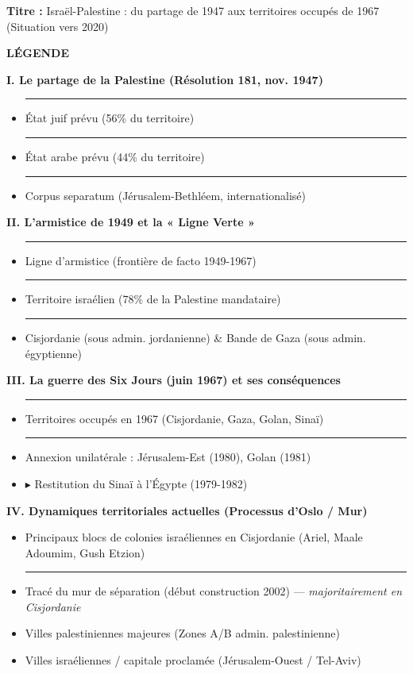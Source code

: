 \documentclass[11pt]{article}
\begin{document}
\begin{exoresolu}
\textbf{Titre :} Israël-Palestine : du partage de 1947 aux territoires occupés de 1967 (Situation vers 2020)

\textbf{LÉGENDE}

\textbf{I. Le partage de la Palestine (Résolution 181, nov. 1947)}
\begin{itemize}
    \item \textcolor{popblue!60!white}{\rule{5mm}{3mm}} État juif prévu (56\% du territoire)
    \item \textcolor{poporange!70!white}{\rule{5mm}{3mm}} État arabe prévu (44\% du territoire)
    \item \textcolor{poppurple!70!white}{\rule{5mm}{3mm}} Corpus separatum (Jérusalem-Bethléem, internationalisé)
\end{itemize}

\textbf{II. L'armistice de 1949 et la « Ligne Verte »}
\begin{itemize}
    \item \textcolor{popgreen!70!black}{\rule[0.5ex]{5mm}{1.5pt}} Ligne d'armistice (frontière de facto 1949-1967)
    \item \textcolor{popblue!40!white}{\rule{5mm}{3mm}} Territoire israélien (78\% de la Palestine mandataire)
    \item \textcolor{poporange!40!white}{\rule{5mm}{3mm}} Cisjordanie (sous admin. jordanienne) \& Bande de Gaza (sous admin. égyptienne)
\end{itemize}

\textbf{III. La guerre des Six Jours (juin 1967) et ses conséquences}
\begin{itemize}
    \item \textcolor{popred!50!white}{\rule{5mm}{3mm}} Territoires occupés en 1967 (Cisjordanie, Gaza, Golan, Sinaï)
    \item \textcolor{popred}{\rule[0.5ex]{5mm}{2pt}} Annexion unilatérale : Jérusalem-Est (1980), Golan (1981)
    \item $\blacktriangleright$ \textcolor{popred}{Restitution du Sinaï à l'Égypte (1979-1982)}
\end{itemize}

\textbf{IV. Dynamiques territoriales actuelles (Processus d'Oslo / Mur)}
\begin{itemize}
    \item \textcolor{popred}{\textbullet} Principaux blocs de colonies israéliennes en Cisjordanie (Ariel, Maale Adoumim, Gush Etzion)
    \item \textcolor{popred}{\rule[0.5ex]{5mm}{2.5pt}} Tracé du mur de séparation (début construction 2002) — \textit{majoritairement en Cisjordanie}
    \item \textcolor{popblue}{\textbullet} Villes palestiniennes majeures (Zones A/B admin. palestinienne)
    \item \textcolor{popdark}{\textbullet} Villes israéliennes / capitale proclamée (Jérusalem-Ouest / Tel-Aviv)
\end{itemize}


\end{exoresolu}
\end{document}
